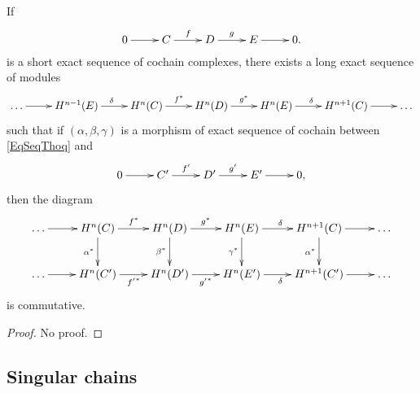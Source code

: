 \begin{theorem}
If 
\begin{equation}		\label{EqSeqThoq}
  \xymatrix{%
   0 \ar[r]	&	C\ar[r]^{f}	&D\ar[r]^{g}	&E\ar[r]	&0.
}
\end{equation}
is a short exact sequence of cochain complexes, there exists a long exact sequence of modules
\[
  \xymatrix{%
 \ldots\ar[r] & H^{n-1}(E)\ar[r]^{\delta}&  H^n(C) \ar[r]^{f^*}	& H^n(D)\ar[r]^{g^*}	&H^n(E)\ar[r]^{\delta}	&H^{n+1}(C)\ar[r]	&\ldots
}
\]
such that if $(\alpha,\beta,\gamma)$ is a morphism of exact sequence of cochain between \eqref{EqSeqThoq} and
\begin{equation}	
  \xymatrix{%
   0 \ar[r]	&	C'\ar[r]^{f'}	&D'\ar[r]^{g'}	&E'\ar[r]	&0,
}
\end{equation}
 then the diagram
\begin{equation}		
\xymatrix{%
\ldots \ar[r]&H^n(C)\ar[d]_{\alpha^*}\ar[r]^{f^*}&H^n(D)\ar[d]_{\beta^*}\ar[r]^{g^*}&H^n(E)\ar[d]_{\gamma^*}\ar[r]^{\delta}&H^{n+1}(C)\ar[d]_{\alpha^*}\ar[r]&\ldots\\
   \ldots \ar[r]&H^n(C')\ar[r]_{ {f'}^*}			&H^n(D')\ar[r]_{ {g'}^*}&H^n(E')\ar[r]_{\delta}	&H^{n+1}(C')\ar[r]	& \ldots
}
\end{equation}
is commutative.
\end{theorem}
\begin{proof}
No proof.
\end{proof}


					\subsection{Singular chains}

